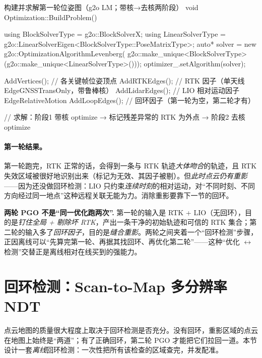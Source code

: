 \begin{codebox}[C++]{构建并求解第一轮位姿图（g2o LM；带核→去核两阶段）}
void Optimization::BuildProblem() {
  using BlockSolverType  = g2o::BlockSolverX;
  using LinearSolverType = g2o::LinearSolverEigen<BlockSolverType::PoseMatrixType>;
  auto* solver = new g2o::OptimizationAlgorithmLevenberg(
      g2o::make_unique<BlockSolverType>(g2o::make_unique<LinearSolverType>()));
  optimizer_.setAlgorithm(solver);

  AddVertices();     // 各关键帧位姿顶点
  AddRTKEdges();     // RTK 因子（单天线 EdgeGNSSTransOnly，带鲁棒核）
  AddLidarEdges();   // LIO 相对运动因子 EdgeRelativeMotion
  AddLoopEdges();    // 回环因子（第一轮为空，第二轮才有）
}
// 求解：阶段1 带核 optimize → 标记残差异常的 RTK 为外点 → 阶段2 去核 optimize
\end{codebox}

\paragraph{第一轮结果。}
第一轮跑完，RTK 正常的话，会得到一条与 RTK 轨迹\emph{大体吻合}的轨迹，且 RTK 失效区域被很好地识别出来（标记为无效、其因子被剔）。但\emph{此时点云仍有重影}——因为还没做回环检测：LIO 只约束\emph{连续时刻}的相对运动，对“不同时刻、不同方向经过同一地点”这种远程关联无能为力。消除重影要靠下一节的回环。

\begin{note}
\textbf{两轮 PGO 不是“同一优化跑两次”.}\;
第一轮的输入是 RTK + LIO（无回环），目的是\emph{钉住全局 + 剔除坏 RTK}，产出一条干净的初始轨迹和可信的 RTK 集合；第二轮的输入多了\emph{回环因子}，目的是\emph{缝合重影}。两轮之间夹着一个“回环检测”步骤，正因离线可以“先算完第一轮、再据其找回环、再优化第二轮”——这种“优化 $\leftrightarrow$ 检测”交替正是离线相对在线买到的强能力。
\end{note}

\section{回环检测：Scan-to-Map 多分辨率 NDT}
\label{sec:lidar-map-loop}

点云地图的质量很大程度上取决于回环检测是否充分\cite{gao2023slamad}。没有回环，重影区域的点云在地图上始终是“两道”；有了正确回环，第二轮 PGO 才能把它们拉回一道。本节设计一套\emph{离线}回环检测：一次性把所有该检查的区域查完，并发配准。


